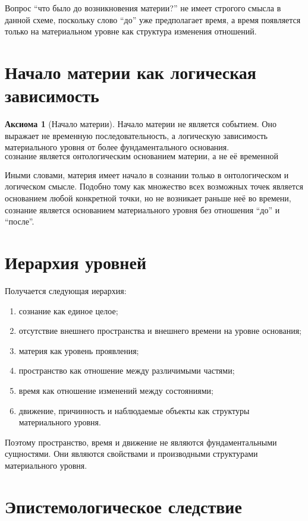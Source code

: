 \documentclass[12pt,a4paper,oneside]{book}
\theoremstyle{definition}
\newtheorem{axiom}{Аксиома}[chapter]
\theoremstyle{plain}
\theoremstyle{remark}
\begin{document}
Вопрос ``что было до возникновения материи?'' не имеет строгого смысла в данной
схеме, поскольку слово ``до'' уже предполагает время, а время появляется только
на материальном уровне как структура изменения отношений.

\section{Начало материи как логическая зависимость}

\begin{axiom}[Начало материи]
Начало материи не является событием. Оно выражает не временную последовательность,
а логическую зависимость материального уровня от более фундаментального основания.
\[
\boxed{\text{сознание является онтологическим основанием материи, а не её временной причиной.}}
\]
\end{axiom}

Иными словами, материя имеет начало в сознании только в онтологическом и логическом
смысле. Подобно тому как множество всех возможных точек является основанием любой
конкретной точки, но не возникает раньше неё во времени, сознание является
основанием материального уровня без отношения ``до'' и ``после''.

\section{Иерархия уровней}

Получается следующая иерархия:

\begin{enumerate}
    \item сознание как единое целое;
    \item отсутствие внешнего пространства и внешнего времени на уровне основания;
    \item материя как уровень проявления;
    \item пространство как отношение между различимыми частями;
    \item время как отношение изменений между состояниями;
    \item движение, причинность и наблюдаемые объекты как структуры материального
    уровня.
\end{enumerate}

Поэтому пространство, время и движение не являются фундаментальными сущностями.
Они являются свойствами и производными структурами материального уровня.

\section{Эпистемологическое следствие}
\end{document}
